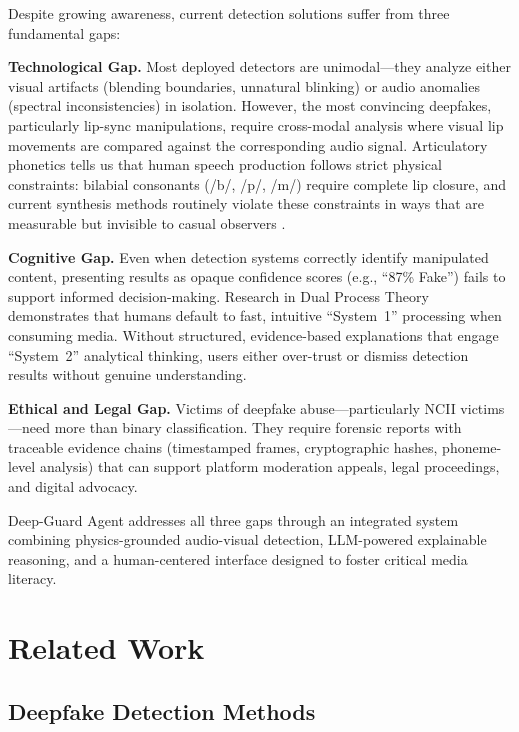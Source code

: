 \documentclass[11pt,a4paper]{article}
\begin{document}
Despite growing awareness, current detection solutions suffer from three fundamental gaps:

\textbf{Technological Gap.} Most deployed detectors are unimodal---they analyze either visual artifacts (blending boundaries, unnatural blinking) or audio anomalies (spectral inconsistencies) in isolation. However, the most convincing deepfakes, particularly lip-sync manipulations, require cross-modal analysis where visual lip movements are compared against the corresponding audio signal. Articulatory phonetics tells us that human speech production follows strict physical constraints: bilabial consonants (/b/, /p/, /m/) require complete lip closure, and current synthesis methods routinely violate these constraints in ways that are measurable but invisible to casual observers \citep{wang2024artavdf}.

\textbf{Cognitive Gap.} Even when detection systems correctly identify manipulated content, presenting results as opaque confidence scores (e.g., ``87\% Fake'') fails to support informed decision-making. Research in Dual Process Theory \citep{kahneman2011thinking} demonstrates that humans default to fast, intuitive ``System~1'' processing when consuming media. Without structured, evidence-based explanations that engage ``System~2'' analytical thinking, users either over-trust or dismiss detection results without genuine understanding.

\textbf{Ethical and Legal Gap.} Victims of deepfake abuse---particularly NCII victims---need more than binary classification. They require forensic reports with traceable evidence chains (timestamped frames, cryptographic hashes, phoneme-level analysis) that can support platform moderation appeals, legal proceedings, and digital advocacy.

Deep-Guard Agent addresses all three gaps through an integrated system combining physics-grounded audio-visual detection, LLM-powered explainable reasoning, and a human-centered interface designed to foster critical media literacy.


\section{Related Work}

\subsection{Deepfake Detection Methods}
\end{document}
